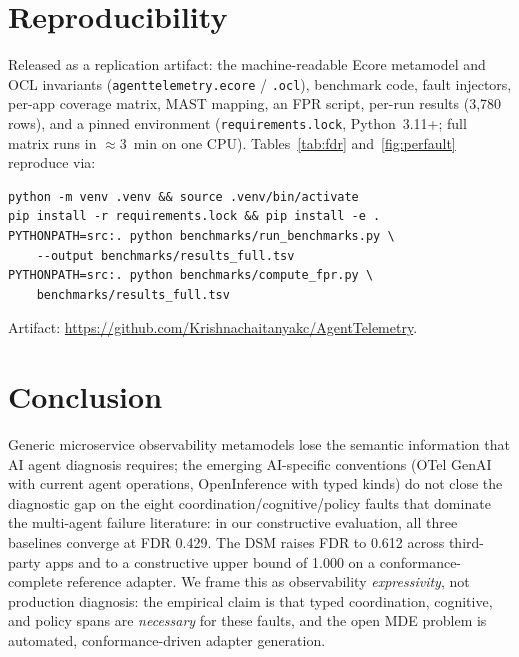 \documentclass[sigconf,nonacm]{acmart}
\begin{document}
\section{Reproducibility}
\label{sec:repro}

\begingroup\sloppy
Released as a replication artifact: the machine-readable Ecore metamodel and OCL invariants (\texttt{agenttelemetry.ecore} / \texttt{.ocl}), benchmark code, fault injectors, per-app coverage matrix, MAST mapping, an FPR script, per-run results (3{,}780 rows), and a pinned environment (\texttt{requirements.lock}, Python~3.11+; full matrix runs in $\approx$3~min on one CPU). Tables~\ref{tab:fdr} and~\ref{fig:perfault} reproduce via:
\endgroup

\begin{lstlisting}[basicstyle=\ttfamily\tiny,frame=none,xleftmargin=0pt,breaklines=true,postbreak={\mbox{$\hookrightarrow$\space}}]
python -m venv .venv && source .venv/bin/activate
pip install -r requirements.lock && pip install -e .
PYTHONPATH=src:. python benchmarks/run_benchmarks.py \
    --output benchmarks/results_full.tsv
PYTHONPATH=src:. python benchmarks/compute_fpr.py \
    benchmarks/results_full.tsv
\end{lstlisting}

\noindent Artifact: \url{https://github.com/Krishnachaitanyakc/AgentTelemetry}.

\section{Conclusion}

Generic microservice observability metamodels lose the semantic information that AI agent diagnosis requires; the emerging AI-specific conventions (OTel GenAI with current agent operations, OpenInference with typed kinds) do not close the diagnostic gap on the eight coordination/cognitive/policy faults that dominate the multi-agent failure literature: in our constructive evaluation, all three baselines converge at FDR 0.429. The DSM raises FDR to 0.612 across third-party apps and to a constructive upper bound of 1.000 on a conformance-complete reference adapter. We frame this as observability \emph{expressivity}, not production diagnosis: the empirical claim is that typed coordination, cognitive, and policy spans are \emph{necessary} for these faults, and the open MDE problem is automated, conformance-driven adapter generation.



\end{document}
